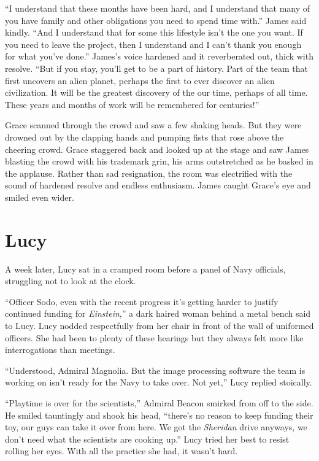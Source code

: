 \documentclass[openany, 12pt]{book} %
\begin{document}
``I understand that these months have been hard, and I understand that many of you have family and other obligations you need to spend time with.'' James said kindly. ``And I understand that for some this lifestyle isn't the one you want. If you need to leave the project, then I understand and I can't thank you enough for what you've done.'' James's voice hardened and it reverberated out, thick with resolve. ``But if you stay, you'll get to be a part of history. Part of the team that first uncovers an alien planet, perhaps the first to ever discover an alien civilization. It will be the greatest discovery of the our time, perhaps of all time. These years and months of work will be remembered for centuries!''

Grace scanned through the crowd and saw a few shaking heads. But they were drowned out by the clapping hands and pumping fists that rose above the cheering crowd. Grace staggered back and looked up at the stage and saw James blasting the crowd with his trademark grin, his arms outstretched as he basked in the applause. Rather than sad resignation, the room was electrified with the sound of hardened resolve and endless enthusiasm.  James caught Grace's eye and smiled even wider.

\chapter{Lucy}
A week later, Lucy sat in a cramped room before a panel of Navy officials, struggling not to look at the clock.

``Officer Sodo, even with the recent progress it's getting harder to justify continued funding for \textit{Einstein},'' a dark haired woman behind a metal bench said to Lucy. Lucy nodded respectfully from her chair in front of the wall of uniformed officers. She had been to plenty of these hearings but they always felt more like interrogations than meetings.

``Understood, Admiral Magnolia. But the image processing software the team is working on isn't ready for the Navy to take over. Not yet,'' Lucy replied stoically.

``Playtime is over for the scientists,'' Admiral Beacon smirked from off to the side. He smiled tauntingly and shook his head, ``there's no reason to keep funding their toy, our guys can take it over from here. We got the \textit{Sheridan} drive anyways, we don't need what the scientists are cooking up.'' Lucy tried her best to resist rolling her eyes. With all the practice she had, it wasn't hard.
\end{document}
